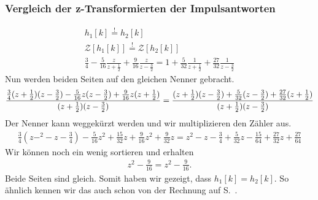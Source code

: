 \documentclass[11pt,a4paper,DIV=12]{scrartcl}
\begin{document}
\subsubsection{Vergleich der z-Transformierten der Impulsantworten}
%
\begin{gather}
	h_1[k]\overset{!}{=}h_2[k]\\
	\mathcal{Z}[h_1[k]]\overset{!}{=}\mathcal{Z}[h_2[k]]\\
	\frac{3}{4}-\frac{5}{16}\frac{z}{z+\frac{1}{2}}+\frac{9}{16}\frac{z}{z-\frac{3}{2}}
	=1+\frac{5}{32}\frac{1}{z+\frac{1}{2}}+\frac{27}{32}\frac{1}{z-\frac{3}{2}}
\end{gather}
%
Nun werden beiden Seiten auf den gleichen Nenner gebracht.
%
\begin{gather}
	\frac{
		\frac{3}{4}(z+\frac{1}{2})(z-\frac{3}{2})-\frac{5}{16}z(z-\frac{3}{2})+\frac{9}{16}z(z+\frac{1}{2})
	}
	{
		(z+\frac{1}{2})(z-\frac{3}{2})
	}
	=\frac{
		(z+\frac{1}{2})(z-\frac{3}{2})+\frac{5}{32}(z-\frac{3}{2})+\frac{27}{32}(z+\frac{1}{2})
	}
	{
		(z+\frac{1}{2})(z-\frac{3}{2})
	}
\end{gather}
%
Der Nenner kann weggekürzt werden und wir multiplizieren den Zähler aus.
%
\begin{gather}
	\frac{3}{4}(z-^2-z-\frac{3}{4})-\frac{5}{16}z^2+\frac{15}{32}z+\frac{9}{16}z^2+\frac{9}{32}z
	=z^2-z-\frac{3}{4}+\frac{5}{32}z-\frac{15}{64}+\frac{27}{32}z+\frac{27}{64}
\end{gather}
%
Wir können noch ein wenig sortieren und erhalten
%
\begin{gather}
	z^2-\frac{9}{16}=z^2-\frac{9}{16}.
\end{gather}
%
Beide Seiten sind gleich. Somit haben wir gezeigt, dass $h_1[k]=h_2[k]$.
%
So ähnlich kennen wir das auch schon von der Rechnung auf S.~\pageref{eq:H1equalH2}.
%

\end{document}
